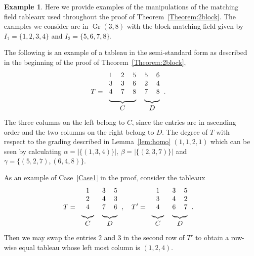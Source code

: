 \documentclass[10pt]{amsart}
\theoremstyle{definition}
\newtheorem{exam}[theo]{Example}
\DeclareMathOperator{\Gr}{Gr}
\begin{document}
\begin{exam} \label{example:thm2blockillustration}
Here we provide examples of the manipulations of the matching field tableaux used throughout the proof of Theorem~\ref{Theorem:2block}. 
The examples we consider are in $\Gr(3,8)$ with the block matching field given by $I_1 = \{1,2,3,4 \}$ and $I_2 = \{5,6,7,8\}$.


The following is an example of a tableau in the semi-standard form as described in the beginning of the proof of Theorem~\ref{Theorem:2block}, 
\[
T = 
\begin{tabular}{ccccc}
 1 & 2 & 5 & 5 & 6 \\
 3 & 3 & 6 & 2 & 4 \\
 4 & 7 & 8 & 7 & 8 \\
 \multicolumn{3}{c}{\upbracefill} & \multicolumn{2}{c}{\upbracefill}\\
 \multicolumn{3}{c}{$C$} & \multicolumn{2}{c}{$D$}\\
\end{tabular}.
\]
The three columns on the left belong to $C$, since the entries are in ascending order and the two columns on the right belong to $D$. The degree of $T$ with respect to the grading described in Lemma~\ref{lem:homo} $(1,1,2,1)$ which can be seen by calculating $\alpha = |\{(1,3,4)\}|$, $\beta = |\{(2,3,7)\}|$ and $\gamma = \{(5,2,7), (6,4,8)\}$. 


As an example of Case~\ref{Case1} in the proof, consider the tableaux
\[
T = 
\begin{tabular}{ccc}
 1 & 3 & 5 \\
 2 & 4 & 3 \\
 4 & 7 & 6 \\
 \multicolumn{1}{c}{\upbracefill} & \multicolumn{2}{c}{\upbracefill}\\
 \multicolumn{1}{c}{$C$} & \multicolumn{2}{c}{$D$}\\
\end{tabular}, 
\quad
T' = 
\begin{tabular}{ccc}
 1 & 3 & 5 \\
 3 & 4 & 2 \\
 4 & 6 & 7 \\
 \multicolumn{1}{c}{\upbracefill} & \multicolumn{2}{c}{\upbracefill}\\
 \multicolumn{1}{c}{$C$} & \multicolumn{2}{c}{$D$}\\
\end{tabular}.
\]
Then we may swap the entries $2$ and $3$ in the second row of $T'$ to obtain a row-wise equal tableau whose left most column is $(1,2,4)$. 


\end{exam}
\end{document}
